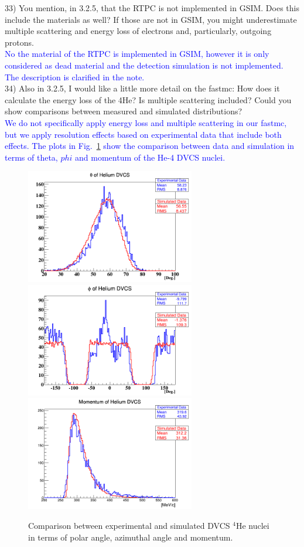  
33) You mention, in 3.2.5, that the RTPC is not implemented in GSIM. Does this 
include the materials as well? If those are not in GSIM, you might 
underestimate multiple scattering and energy loss of electrons and, 
particularly, outgoing protons.\\
\textcolor{blue}{No the material of the RTPC is implemented in GSIM,
however it is only considered as dead material and the detection 
simulation is not implemented. The description is clarified in the
note.} \\


34) Also in 3.2.5, I would like a little more detail on the fastmc: How does it 
calculate the energy loss of the 4He? Is multiple scattering included? Could 
you show comparisons between measured and simulated distributions?\\
\textcolor{blue}{We do not specifically apply energy loss and multiple 
scattering in our fastmc, but we apply resolution effects based on 
experimental data that include both effects. The plots in Fig.~\ref{fig:comp_He} 
show the comparison between data and simulation in terms of theta, $phi$ and 
momentum of the He-4 DVCS nuclei.}\\

\begin{figure}[!h]
\includegraphics[height=5.0cm]{fig/He_theta.png}
\includegraphics[height=5.0cm]{fig/He_phi.png}
\centering
\includegraphics[height=5.0cm]{fig/He_mom.png}
\caption{Comparison between experimental and simulated DVCS $^{4}$He nuclei in 
terms of polar angle, azimuthal angle and momentum.}
\label{fig:comp_He}
\end{figure}

